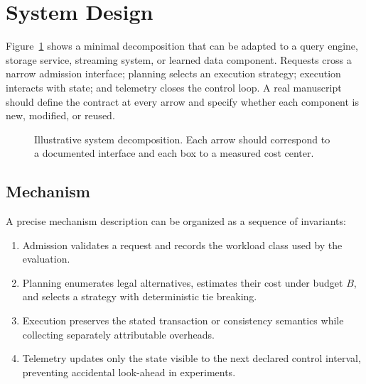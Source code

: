 \section{System Design}

Figure~\ref{fig:architecture} shows a minimal decomposition that can be adapted
to a query engine, storage service, streaming system, or learned data component.
Requests cross a narrow admission interface; planning selects an execution
strategy; execution interacts with state; and telemetry closes the control
loop.  A real manuscript should define the contract at every arrow and specify
whether each component is new, modified, or reused.

\begin{figure}[H]
  \centering
  \setlength{\fboxsep}{6pt}
  \caption{Illustrative system decomposition.  Each arrow should correspond
  to a documented interface and each box to a measured cost center.}
  \label{fig:architecture}
\end{figure}

\subsection{Mechanism}

A precise mechanism description can be organized as a sequence of invariants:

\begin{enumerate}
  \item Admission validates a request and records the workload class used by
        the evaluation.
  \item Planning enumerates legal alternatives, estimates their cost under
        budget $B$, and selects a strategy with deterministic tie breaking.
  \item Execution preserves the stated transaction or consistency semantics
        while collecting separately attributable overheads.
  \item Telemetry updates only the state visible to the next declared control
        interval, preventing accidental look-ahead in experiments.
\end{enumerate}

